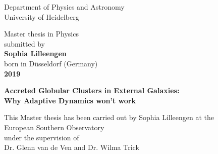 
\begin{titlepage}
\thispagestyle{empty}
\begin{center}
  \renewcommand{\baselinestretch}{2.00}
  \Large\sffamily
  Department of Physics and Astronomy\\
  \large University of Heidelberg
  \par\vfill\normalfont
  Master thesis in Physics\\
  submitted by\\
  \textbf{Sophia Lilleengen}\\
  born in D\"usseldorf (Germany)\\
  \textbf{2019}
\end{center}
\newpage
\thispagestyle{empty}
\mbox{}
\newpage
\thispagestyle{empty}
\begin{center}
  \renewcommand{\baselinestretch}{2.00}
  \Large\bfseries\sffamily
    Accreted Globular Clusters in External Galaxies:\\
    Why Adaptive Dynamics won't work
  \par
  \vfill
  \large\normalfont
  This Master thesis has been carried out by Sophia Lilleengen at the\\
  European Southern Observatory\\
  under the supervision of\\
  Dr. Glenn van de Ven and Dr. Wilma Trick
\end{center}\par
\vspace{5\baselineskip}

\renewcommand{\baselinestretch}{1.00}\normalsize
\end{titlepage}
